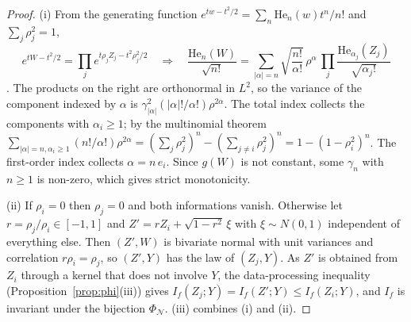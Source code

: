 \documentclass[11pt,a4paper]{article}
\theoremstyle{definition}
\theoremstyle{remark}
\newcommand{\NPhi}{\Phi_{\mathcal N}}
\begin{document}
\begin{proof}
(i) From the generating function $e^{tw-t^2/2}=\sum_n\mathrm{He}_n(w)t^n/n!$ and $\sum_j\rho_j^2=1$,
\[
e^{tW-t^2/2}=\prod_je^{t\rho_jZ_j-t^2\rho_j^2/2}\quad\Longrightarrow\quad \frac{\mathrm{He}_n(W)}{\sqrt{n!}}=\sum_{|\alpha|=n}\sqrt{\frac{n!}{\alpha!}}\,\rho^\alpha\,\prod_j\frac{\mathrm{He}_{\alpha_j}(Z_j)}{\sqrt{\alpha_j!}}
\]
\citep[see also][Chapter~3]{janson1997}. The products on the right are orthonormal in $L^2$, so the variance of the component indexed by $\alpha$ is $\gamma_{|\alpha|}^2(|\alpha|!/\alpha!)\rho^{2\alpha}$. The total index collects the components with $\alpha_i\ge1$; by the multinomial theorem $\sum_{|\alpha|=n,\alpha_i\ge1}(n!/\alpha!)\rho^{2\alpha}=(\sum_j\rho_j^2)^n-(\sum_{j\ne i}\rho_j^2)^n=1-(1-\rho_i^2)^n$. The first-order index collects $\alpha=n\,e_i$. Since $g(W)$ is not constant, some $\gamma_n$ with $n\ge1$ is non-zero, which gives strict monotonicity.

(ii) If $\rho_i=0$ then $\rho_j=0$ and both informations vanish. Otherwise let $r=\rho_j/\rho_i\in[-1,1]$ and $Z'=rZ_i+\sqrt{1-r^2}\,\xi$ with $\xi\sim N(0,1)$ independent of everything else. Then $(Z',W)$ is bivariate normal with unit variances and correlation $r\rho_i=\rho_j$, so $(Z',Y)$ has the law of $(Z_j,Y)$. As $Z'$ is obtained from $Z_i$ through a kernel that does not involve $Y$, the data-processing inequality (Proposition~\ref{prop:phi}(iii)) gives $I_f(Z_j;Y)=I_f(Z';Y)\le I_f(Z_i;Y)$, and $I_f$ is invariant under the bijection $\NPhi$. (iii) combines (i) and (ii).
\end{proof}
\end{document}
